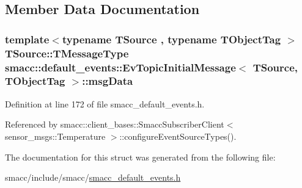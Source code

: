 \subsection{Member Data Documentation}
\subsubsection[{\texorpdfstring{msg\+Data}{msgData}}]{\setlength{\rightskip}{0pt plus 5cm}template$<$typename T\+Source , typename T\+Object\+Tag $>$ T\+Source\+::\+T\+Message\+Type {\bf smacc\+::default\+\_\+events\+::\+Ev\+Topic\+Initial\+Message}$<$ T\+Source, T\+Object\+Tag $>$\+::msg\+Data}\hypertarget{structsmacc_1_1default__events_1_1EvTopicInitialMessage_a989c7cf4210c7750806b081bc73112cd}{}\label{structsmacc_1_1default__events_1_1EvTopicInitialMessage_a989c7cf4210c7750806b081bc73112cd}


Definition at line 172 of file smacc\+\_\+default\+\_\+events.\+h.



Referenced by smacc\+::client\+\_\+bases\+::\+Smacc\+Subscriber\+Client$<$ sensor\+\_\+msgs\+::\+Temperature $>$\+::configure\+Event\+Source\+Types().



The documentation for this struct was generated from the following file\+:\begin{DoxyCompactItemize}
\item 
smacc/include/smacc/\hyperlink{smacc__default__events_8h}{smacc\+\_\+default\+\_\+events.\+h}\end{DoxyCompactItemize}
